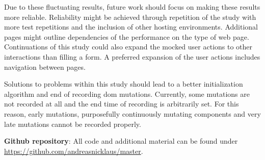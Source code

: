 \documentclass[a4paper, 12pt]{article}
\makeatletter
\renewcommand\listoffigures{%
  \section{\listfigurename}%
  \@mkboth{\MakeUppercase\listfigurename}{\MakeUppercase\listfigurename}%
  \@starttoc{lof}%
}
\renewcommand\listoftables{%
  \section{\listtablename}%
  \@mkboth{\MakeUppercase\listtablename}{\MakeUppercase\listtablename}%
  \@starttoc{lot}%
}
\renewcommand\lstlistoflistings{
  \section{\lstlistlistingname}
  \@starttoc{lol}%
}
\makeatother
\begin{document}
Due to these fluctuating results, future work should focus on making these results more reliable.
Reliability might be achieved through repetition of the study with more test repetitions and the inclusion of other hosting environments.
Additional pages might outline dependencies of the performance on the type of web page.
Continuations of this study could also expand the mocked user actions to other interactions than filling a form.
A preferred expansion of the user actions includes navigation between pages.

Solutions to problems within this study should lead to a better initialization algorithm and end of recording \acrshort{dom} mutations.
Currently, some mutations are not recorded at all and the end time of recording is arbitrarily set.
For this reason, early mutations, purposefully continuously mutating components and very late mutations cannot be recorded properly.

\pagebreak

\appendix



\printnoidxglossary[
  type=\acronymtype,
  nonumberlist,
  nogroupskip,
]

{}

\textbf{Github repository}: All code and additional material can be found under \url{https://github.com/andreasnicklaus/master}.

\end{document}
